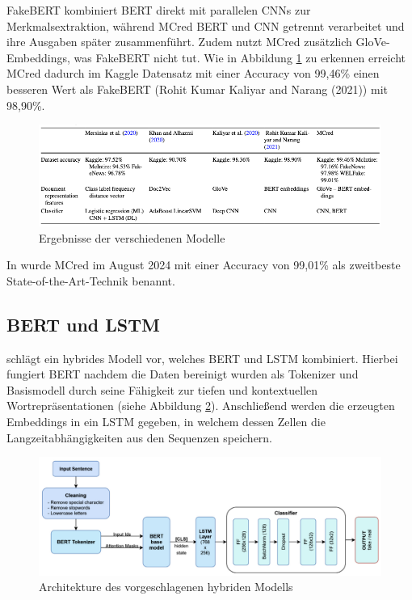 FakeBERT kombiniert BERT direkt mit parallelen CNNs zur Merkmalsextraktion, während MCred BERT und CNN getrennt verarbeitet und 
ihre Ausgaben später zusammenführt. Zudem nutzt MCred zusätzlich GloVe-Embeddings, was FakeBERT nicht tut. 
Wie in Abbildung \ref{fig:bert_cnn_mcred} zu erkennen erreicht MCred dadurch im Kaggle Datensatz mit einer Accuracy von 99,46\% 
einen besseren Wert als FakeBERT (Rohit Kumar Kaliyar and Narang (2021)) mit 98,90\%.

\begin{figure}[htbp]
    \begin{center}
    \includegraphics[scale=0.49]{static/bert_cnn_mcred.png}
    \caption{\label{fig:bert_cnn_mcred} Ergebnisse der verschiedenen Modelle \cite{Verma:2023aa}}
    \end{center}
\end{figure}

In \cite{Dhiman:2024aa} wurde MCred im August 2024 mit einer Accuracy von 99,01\% als zweitbeste State-of-the-Art-Technik benannt.

\subsection{BERT und LSTM}

\cite{RAI202298} schlägt ein hybrides Modell vor, welches BERT und LSTM kombiniert. Hierbei fungiert BERT nachdem die Daten bereinigt wurden als Tokenizer und
Basismodell durch seine Fähigkeit zur tiefen und kontextuellen Wortrepräsentationen (siehe Abbildung \ref{fig:bert_lstm_architecture}). 
Anschließend werden die erzeugten Embeddings in ein LSTM gegeben, in welchem dessen Zellen die Langzeitabhängigkeiten aus den Sequenzen speichern.

\begin{figure}[htbp]
    \begin{center}
    \includegraphics[scale=0.34]{static/bert_lstm_architecture.png}
    \caption{\label{fig:bert_lstm_architecture} Architekture des vorgeschlagenen hybriden Modells  \cite{RAI202298}}
    \end{center}
\end{figure}

